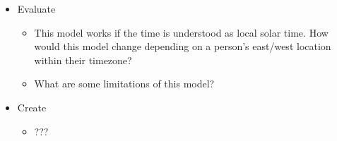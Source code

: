 \documentclass[tikz]{article}
\newif\ifPrintWishlist  %
\begin{document}
\begin{itemize}
\begin{itemize}
\begin{itemize}
\begin{itemize}
				\end{itemize}
				\item Evaluate
				\begin{itemize}
					\item This model works if the time is understood as local solar time. How would this model change depending on a person's east/west location within their timezone?
					\item What are some limitations of this model? %
				\end{itemize}
				\item Create
				\begin{itemize}
					\item ???
				\end{itemize}
				
			\end{itemize}
		\end{itemize}
	\end{itemize}

\fi %

\end{document}
